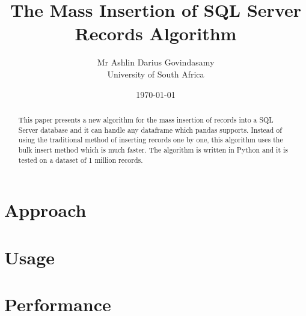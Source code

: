 \documentclass{report}
\title{The Mass Insertion of SQL Server Records Algorithm}
\author{Mr Ashlin Darius Govindasamy\\ \large{University of South Africa}}
\date{\today}
\begin{document}
\maketitle
\newpage

\begin{abstract}
    This paper presents a new algorithm for the mass insertion of records into a SQL Server database and it can handle any dataframe which pandas supports. Instead of using the traditional method of inserting records one by one, this algorithm uses the bulk insert method which is much faster. The algorithm is written in Python and it is tested on a dataset of 1 million records.
\end{abstract}

\tableofcontents


\chapter{Approach}


\chapter{Usage}


\chapter{Performance}


\newpage
\end{document}
